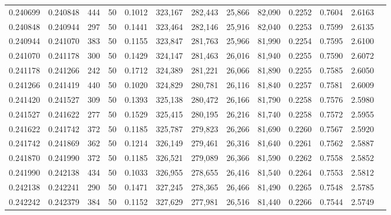 \begin{tabular}{rrrrrrrrrrrrr}
0.240699 & 0.240848 &   444 &  50 &                                     0.1012 & 323,167 & 282,443 &  25,866 &  82,090 & 0.2252 & 0.7604 & 2.6163 \\
0.240848 & 0.240944 &   297 &  50 &                                     0.1441 & 323,464 & 282,146 &  25,916 &  82,040 & 0.2253 & 0.7599 & 2.6135 \\
0.240944 & 0.241070 &   383 &  50 &                                     0.1155 & 323,847 & 281,763 &  25,966 &  81,990 & 0.2254 & 0.7595 & 2.6100 \\
0.241070 & 0.241178 &   300 &  50 &                                     0.1429 & 324,147 & 281,463 &  26,016 &  81,940 & 0.2255 & 0.7590 & 2.6072 \\
0.241178 & 0.241266 &   242 &  50 &                                     0.1712 & 324,389 & 281,221 &  26,066 &  81,890 & 0.2255 & 0.7585 & 2.6050 \\
0.241266 & 0.241419 &   440 &  50 &                                     0.1020 & 324,829 & 280,781 &  26,116 &  81,840 & 0.2257 & 0.7581 & 2.6009 \\
0.241420 & 0.241527 &   309 &  50 &                                     0.1393 & 325,138 & 280,472 &  26,166 &  81,790 & 0.2258 & 0.7576 & 2.5980 \\
0.241527 & 0.241622 &   277 &  50 &                                     0.1529 & 325,415 & 280,195 &  26,216 &  81,740 & 0.2258 & 0.7572 & 2.5955 \\
0.241622 & 0.241742 &   372 &  50 &                                     0.1185 & 325,787 & 279,823 &  26,266 &  81,690 & 0.2260 & 0.7567 & 2.5920 \\
0.241742 & 0.241869 &   362 &  50 &                                     0.1214 & 326,149 & 279,461 &  26,316 &  81,640 & 0.2261 & 0.7562 & 2.5887 \\
0.241870 & 0.241990 &   372 &  50 &                                     0.1185 & 326,521 & 279,089 &  26,366 &  81,590 & 0.2262 & 0.7558 & 2.5852 \\
0.241990 & 0.242138 &   434 &  50 &                                     0.1033 & 326,955 & 278,655 &  26,416 &  81,540 & 0.2264 & 0.7553 & 2.5812 \\
0.242138 & 0.242241 &   290 &  50 &                                     0.1471 & 327,245 & 278,365 &  26,466 &  81,490 & 0.2265 & 0.7548 & 2.5785 \\
0.242242 & 0.242379 &   384 &  50 &                                     0.1152 & 327,629 & 277,981 &  26,516 &  81,440 & 0.2266 & 0.7544 & 2.5749 \\

\end{tabular}
